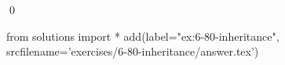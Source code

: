 
\begin{ex}
  \label{ex:6-80-inheritance}
  
  \qed
\end{ex}
\begin{python0}
from solutions import *
add(label="ex:6-80-inheritance",
    srcfilename='exercises/6-80-inheritance/answer.tex')
\end{python0}
